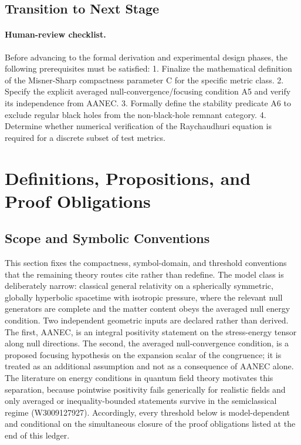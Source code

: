 \documentclass[conference]{IEEEtran}
\begin{document}
\subsection{Transition to Next Stage}
\paragraph{Human-review checklist.} Before advancing to the formal derivation and experimental design phases, the following prerequisites must be satisfied: 1. Finalize the mathematical definition of the Misner-Sharp compactness parameter C for the specific metric class. 2. Specify the explicit averaged null-convergence/focusing condition A5 and verify its independence from AANEC. 3. Formally define the stability predicate A6 to exclude regular black holes from the non-black-hole remnant category. 4. Determine whether numerical verification of the Raychaudhuri equation is required for a discrete subset of test metrics.

\section{Definitions, Propositions, and Proof Obligations}
\subsection{Scope and Symbolic Conventions}
This section fixes the compactness, symbol-domain, and threshold conventions that the remaining theory routes cite rather than redefine. The model class is deliberately narrow: classical general relativity on a spherically symmetric, globally hyperbolic spacetime with isotropic pressure, where the relevant null generators are complete and the matter content obeys the averaged null energy condition. Two independent geometric inputs are declared rather than derived. The first, AANEC, is an integral positivity statement on the stress-energy tensor along null directions. The second, the averaged null-convergence condition, is a proposed focusing hypothesis on the expansion scalar of the congruence; it is treated as an additional assumption and not as a consequence of AANEC alone. The literature on energy conditions in quantum field theory motivates this separation, because pointwise positivity fails generically for realistic fields and only averaged or inequality-bounded statements survive in the semiclassical regime (W3009127927). Accordingly, every threshold below is model-dependent and conditional on the simultaneous closure of the proof obligations listed at the end of this ledger.~\cite{cite_0ed84243cf171bc4}
\end{document}
